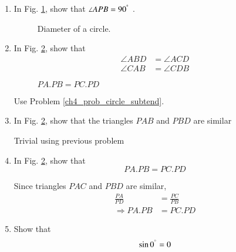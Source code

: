 \begin{enumerate}[label=\arabic*.,ref=\thesubsection.\theenumi]
%
\item
In Fig. \ref{ch4_circle_dia}, show that $\angle APB = 90^{\degree}$ .

%
\begin{figure}[!ht]
	\begin{center}
		
		\resizebox{\columnwidth}{!}{}
	\end{center}
	\caption{Diameter of a circle.}
	\label{ch4_circle_dia}	
\end{figure}
\item
	In Fig. \ref{ch4_chord_product}, show that 
	\begin{equation}
	\begin{split}
\angle ABD &= \angle ACD \\
\angle CAB &= \angle CDB	
	\end{split}
	\end{equation}

\begin{figure}[!ht]
	\begin{center}
		
		\resizebox{\columnwidth}{!}{}
	\end{center}
	\caption{$PA.PB = PC.PD$}
	\label{ch4_chord_product}	
\end{figure}
%
%
\solution Use Problem \ref{ch4_prob_circle_subtend}.
%
\item
	In Fig. \ref{ch4_chord_product}, show that the triangles $PAB$ and $PBD$ are similar

\solution Trivial using previous problem
\item
	In Fig. \ref{ch4_chord_product}, show that 
	\begin{equation}
	PA.PB = PC.PD
	\end{equation}

%
\solution Since triangles $PAC$ and $PBD$ are similar, 
%
\begin{align}
\frac{PA}{PD} &= \frac{PC}{PB} \\
\Rightarrow PA.PB &= PC.PD
\end{align}
%
%
\item
	Show that 
	\begin{equation}
	\label{ch5_sin_zero}
	\sin 0^{\degree} = 0
	\end{equation}


\end{enumerate}
